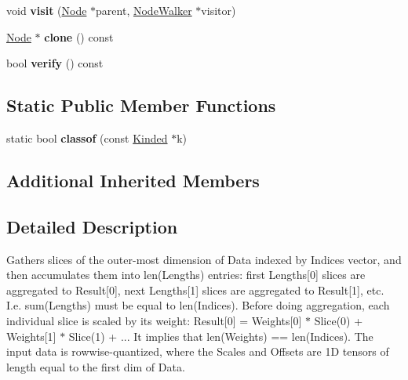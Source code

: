 \begin{DoxyCompactItemize}
\mbox{\label{classglow_1_1_rowwise_quantized_sparse_lengths_weighted_sum_node_af95896bbebf1da0802b87b27a06c1add}} 
void {\bfseries visit} (\hyperlink{classglow_1_1_node}{Node} $\ast$parent, \hyperlink{classglow_1_1_node_walker}{Node\+Walker} $\ast$visitor)
\item 
\mbox{\label{classglow_1_1_rowwise_quantized_sparse_lengths_weighted_sum_node_a7446f38f891d5b3fe062fd7a7cb09e5f}} 
\hyperlink{classglow_1_1_node}{Node} $\ast$ {\bfseries clone} () const
\item 
\mbox{\label{classglow_1_1_rowwise_quantized_sparse_lengths_weighted_sum_node_a0dfa7088d19b432ab05f1113f4933e41}} 
bool {\bfseries verify} () const
\end{DoxyCompactItemize}
\subsection*{Static Public Member Functions}
\begin{DoxyCompactItemize}
\item 
\mbox{\label{classglow_1_1_rowwise_quantized_sparse_lengths_weighted_sum_node_a5d820f22d184081eca1d8520184c071d}} 
static bool {\bfseries classof} (const \hyperlink{classglow_1_1_kinded}{Kinded} $\ast$k)
\end{DoxyCompactItemize}
\subsection*{Additional Inherited Members}


\subsection{Detailed Description}
Gathers slices of the outer-\/most dimension of Data indexed by Indices vector, and then accumulates them into len(\+Lengths) entries\+: first Lengths\mbox{[}0\mbox{]} slices are aggregated to Result\mbox{[}0\mbox{]}, next Lengths\mbox{[}1\mbox{]} slices are aggregated to Result\mbox{[}1\mbox{]}, etc. I.\+e. sum(\+Lengths) must be equal to len(\+Indices). Before doing aggregation, each individual slice is scaled by its weight\+: Result\mbox{[}0\mbox{]} = Weights\mbox{[}0\mbox{]} $\ast$ Slice(0) + Weights\mbox{[}1\mbox{]} $\ast$ Slice(1) + ... It implies that len(\+Weights) == len(\+Indices). The input data is rowwise-\/quantized, where the Scales and Offsets are 1D tensors of length equal to the first dim of Data. 

